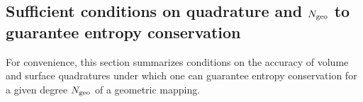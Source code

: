 \documentclass{svjour3}                     %
\renewcommand{\hat}{\widehat}
\newcommand{\pd}[2]{\frac{\partial#1}{\partial#2}}
\newcommand{\LRp}[1]{\left( #1 \right)}
\newcommand{\LRl}[1]{\left. #1 \right|}
\newcommand{\Grad} {\ensuremath{\nabla}}
\renewcommand{\note}[1]{{\color{blue}{#1}}}
\begin{document}
\subsection{Sufficient conditions on quadrature and $N_{\rm geo}$ to guarantee entropy conservation}

For convenience, this section summarizes conditions on the accuracy of volume and surface quadratures under which one can guarantee entropy conservation for a given degree $N_{\rm geo}$ of a geometric mapping.

 \note{finish}

%
%
%
%
\end{document}
